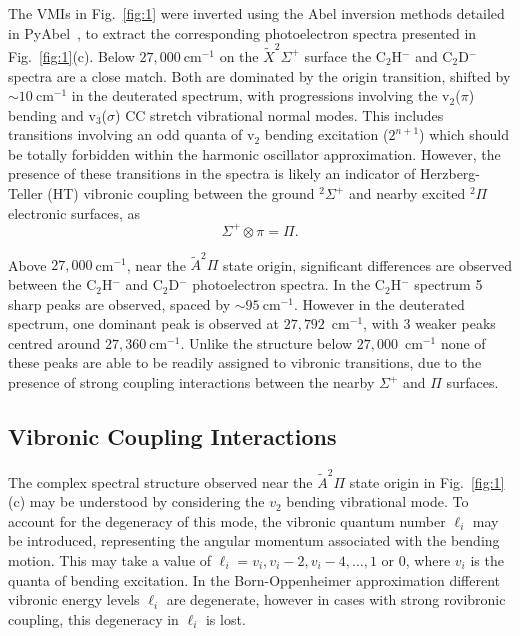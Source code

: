 \documentclass[journal=jpcafh,manuscript=article,layout=onecolumn, 12pt]{achemso}
\begin{document}
The VMIs in Fig.~\ref{fig:1} were inverted using the Abel inversion methods detailed in PyAbel~\cite{hic19}, to extract the corresponding photoelectron spectra presented in Fig.~\ref{fig:1}(c). Below $27,000~$cm$^{-1}$ on the $\tilde{X} ^2\Sigma^+$ surface the C$_2$H$^-$ and C$_2$D$^-$ spectra are a close match. Both are dominated by the origin transition, shifted by $\sim10~$cm$^{-1}$ in the deuterated spectrum, with progressions involving the v$_2$($\pi$) bending and v$_3$($\sigma$) CC stretch vibrational normal modes. This includes transitions involving an odd quanta of v$_2$ bending excitation ($2^{n+1}$) which should be totally forbidden within the harmonic oscillator approximation. However, the presence of these transitions in the spectra is likely an indicator of Herzberg-Teller (HT) vibronic coupling between the ground $^2\Sigma^+$ and nearby excited $^2\Pi$ electronic surfaces, as
\begin{equation}
\Sigma^+ \otimes \pi = \Pi. 
\end{equation}

Above $27,000~$cm$^{-1}$, near the $\tilde{A}^2\Pi$ state origin, significant differences are observed between the C$_2$H$^-$ and C$_2$D$^-$ photoelectron spectra. In the C$_2$H$^-$ spectrum 5 sharp peaks are observed, spaced by $\sim95~$cm$^{-1}$. However in the deuterated spectrum, one dominant peak is observed at $27,792$~cm$^{-1}$, with 3 weaker peaks centred around $27,360~$cm$^{-1}$. Unlike the structure below $27,000$~cm$^{-1}$ none of these peaks are able to be readily assigned to vibronic transitions, due to the presence of strong coupling interactions between the nearby $\Sigma^+$ and $\Pi$ surfaces.




\subsection{Vibronic Coupling Interactions}
The complex spectral structure observed near the $\tilde{A}^2\Pi$ state origin in Fig.~\ref{fig:1}(c) may be understood by considering the $v_2$ bending vibrational mode. To account for the degeneracy of this mode, the vibronic quantum number $\ell_i$ may be introduced, representing the angular momentum associated with the bending motion. This may take a value of $\ell_i = v_i, v_i-2, v_i-4,\dots,1$ or $0$, where $v_i$ is the quanta of bending excitation. In the Born-Oppenheimer approximation different vibronic energy levels $\ell_i$ are degenerate, however in cases with strong rovibronic coupling, this degeneracy in $\ell_i$ is lost. 
\end{document}
